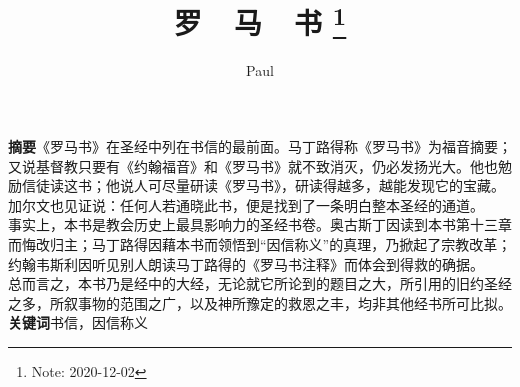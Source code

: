 \documentclass[a4paper,11pt,onecolumn,twoside]{ctexart}
\title{
	\huge{罗~~马~~书}
	\thanks{Note: 2020-12-02}
}
\author{Paul}
\date{}  %
\begin{document}
\newcommand{\supercite}[1]{\textsuperscript{\cite{#1}}}
\maketitle
\setlength{\oddsidemargin}{ 1cm}  %
\setlength{\evensidemargin}{\oddsidemargin}
\setlength{\textwidth}{13.50cm}
\vspace{-.8cm}
\begin{center}
	\parbox{\textwidth}{\textbf{摘要}\quad  《罗马书》在圣经中列在书信的最前面。马丁路得称《罗马书》为福音摘要；又说基督教只要有《约翰福音》和《罗马书》就不致消灭，仍必发扬光大。他也勉励信徒读这书；他说人可尽量研读《罗马书》，研读得越多，越能发现它的宝藏。加尔文也见证说：任何人若通晓此书，便是找到了一条明白整本圣经的通道。\\事实上，本书是教会历史上最具影响力的圣经书卷。奥古斯丁因读到本书第十三章而悔改归主；马丁路得因藉本书而领悟到“因信称义”的真理，乃掀起了宗教改革；约翰韦斯利因听见别人朗读马丁路得的《罗马书注释》而体会到得救的确据。\\总而言之，本书乃是经中的大经，无论就它所论到的题目之大，所引用的旧约圣经之多，所叙事物的范围之广，以及神所豫定的救恩之丰，均非其他经书所可比拟。\\
		\textbf{关键词}\quad 书信，因信称义
}
\end{center}
\end{document}
